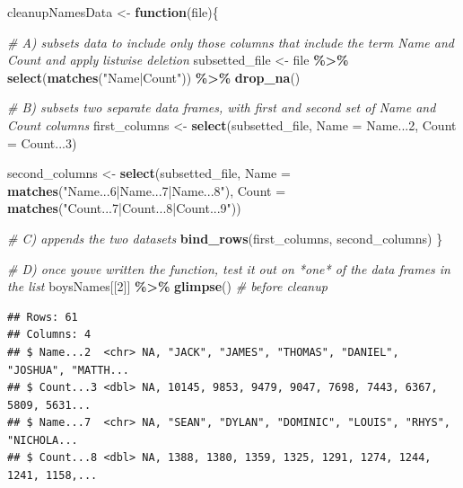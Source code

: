 \documentclass[
]{book}
\newenvironment{Shaded}{\begin{snugshade}}{\end{snugshade}}
\newcommand{\CommentTok}[1]{\textcolor[rgb]{0.56,0.35,0.01}{\textit{#1}}}
\newcommand{\ControlFlowTok}[1]{\textcolor[rgb]{0.13,0.29,0.53}{\textbf{#1}}}
\newcommand{\DataTypeTok}[1]{\textcolor[rgb]{0.13,0.29,0.53}{#1}}
\newcommand{\DecValTok}[1]{\textcolor[rgb]{0.00,0.00,0.81}{#1}}
\newcommand{\KeywordTok}[1]{\textcolor[rgb]{0.13,0.29,0.53}{\textbf{#1}}}
\newcommand{\NormalTok}[1]{#1}
\newcommand{\OperatorTok}[1]{\textcolor[rgb]{0.81,0.36,0.00}{\textbf{#1}}}
\newcommand{\StringTok}[1]{\textcolor[rgb]{0.31,0.60,0.02}{#1}}
\begin{document}
\begin{Shaded}
\begin{Highlighting}[]
\NormalTok{cleanupNamesData \textless{}{-}}\StringTok{ }\ControlFlowTok{function}\NormalTok{(file)\{}

  \CommentTok{\# A) subsets data to include only those columns that include the term \textasciigrave{}Name\textasciigrave{} and \textasciigrave{}Count\textasciigrave{} and apply listwise deletion}
\NormalTok{  subsetted\_file \textless{}{-}}\StringTok{ }\NormalTok{file }\OperatorTok{\%\textgreater{}\%}
\StringTok{    }\KeywordTok{select}\NormalTok{(}\KeywordTok{matches}\NormalTok{(}\StringTok{"Name|Count"}\NormalTok{)) }\OperatorTok{\%\textgreater{}\%}
\StringTok{    }\KeywordTok{drop\_na}\NormalTok{()}

  \CommentTok{\# B) subsets two separate data frames, with first and second set of \textasciigrave{}Name\textasciigrave{} and \textasciigrave{}Count\textasciigrave{} columns }
\NormalTok{  first\_columns \textless{}{-}}\StringTok{ }\KeywordTok{select}\NormalTok{(subsetted\_file, }\DataTypeTok{Name =}\NormalTok{ Name...}\DecValTok{2}\NormalTok{, }\DataTypeTok{Count =}\NormalTok{ Count...}\DecValTok{3}\NormalTok{) }

\NormalTok{  second\_columns \textless{}{-}}\StringTok{ }\KeywordTok{select}\NormalTok{(subsetted\_file, }\DataTypeTok{Name =} \KeywordTok{matches}\NormalTok{(}\StringTok{"Name...6|Name...7|Name...8"}\NormalTok{),}
                                           \DataTypeTok{Count =} \KeywordTok{matches}\NormalTok{(}\StringTok{"Count...7|Count...8|Count...9"}\NormalTok{))}

  \CommentTok{\# C) appends the two datasets}
  \KeywordTok{bind\_rows}\NormalTok{(first\_columns, second\_columns)}
\NormalTok{\}}


\CommentTok{\# D) once you\textquotesingle{}ve written the function, test it out on *one* of the data frames in the list}
\NormalTok{boysNames[[}\DecValTok{2}\NormalTok{]] }\OperatorTok{\%\textgreater{}\%}\StringTok{ }\KeywordTok{glimpse}\NormalTok{() }\CommentTok{\# before cleanup}
\end{Highlighting}
\end{Shaded}

\begin{verbatim}
## Rows: 61
## Columns: 4
## $ Name...2  <chr> NA, "JACK", "JAMES", "THOMAS", "DANIEL", "JOSHUA", "MATTH...
## $ Count...3 <dbl> NA, 10145, 9853, 9479, 9047, 7698, 7443, 6367, 5809, 5631...
## $ Name...7  <chr> NA, "SEAN", "DYLAN", "DOMINIC", "LOUIS", "RHYS", "NICHOLA...
## $ Count...8 <dbl> NA, 1388, 1380, 1359, 1325, 1291, 1274, 1244, 1241, 1158,...
\end{verbatim}
\end{document}
